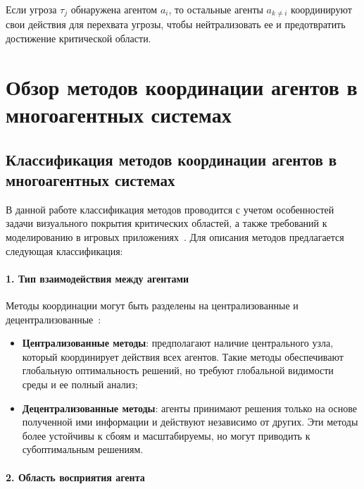 Если угроза $\tau_j$ обнаружена агентом $a_i$, то остальные агенты $a_{k \neq i}$ координируют свои действия для перехвата угрозы, чтобы нейтрализовать ее и предотвратить достижение критической области.

\chapter{Обзор методов координации агентов в многоагентных системах}

\iffalse
В разделе приведена разработанная классификация методов координации агентов, а также описаны известные методы применительно к рассматриваемой задаче~\cite{overview-of-recent}.
\fi

\section{Классификация методов координации агентов в многоагентных системах}

В данной работе классификация методов проводится с учетом особенностей задачи визуального покрытия критических областей, а также требований к моделированию в игровых приложениях~\cite{mas-game-engine}. Для описания методов предлагается следующая классификация:

\subsubsection*{1. Тип взаимодействия между агентами}

Методы координации могут быть разделены на централизованные и децентрализованные~\cite{ieee-mas}:
\begin{itemize}
	\item \textbf{Централизованные методы}: предполагают наличие центрального узла, который координирует действия всех агентов.
	Такие методы обеспечивают глобальную оптимальность решений, но требуют глобальной видимости среды и ее полный анализ;
	\item \textbf{Децентрализованные методы}: агенты принимают решения только на основе полученной ими информации и действуют независимо от других.
	Эти методы более устойчивы к сбоям и масштабируемы, но могут приводить к субоптимальным решениям.
\end{itemize}

\subsubsection*{2. Область восприятия агента}

